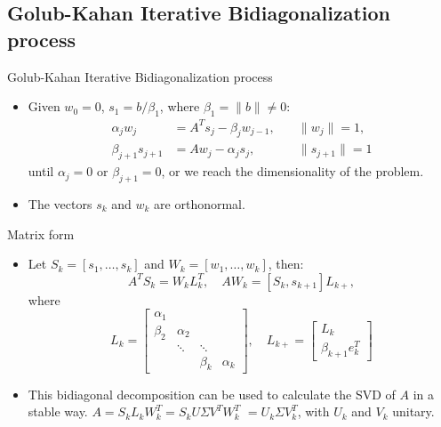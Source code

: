 \documentclass{beamer}
\begin{document}
\subsection{Golub-Kahan Iterative Bidiagonalization process}
\begin{frame}{Golub-Kahan Iterative Bidiagonalization process}
  \begin{itemize}  
    \item Given $w_{0} = 0$, $s_{1} = b/\beta_{1}$, where $\beta_{1} = \|b\| 
      \neq 0$:
      \begin{align*}
	\alpha_{j}w_{j} &= A^{T}s_{j} - \beta_{j}w_{j-1}, &\quad \|w_{j}\|=1,\\
	\beta_{j+1}s_{j+1} &= Aw_{j} - \alpha_{j}s_{j}, &\quad \|s_{j+1}\|=1
      \end{align*}
      until $\alpha_{j} = 0$ or $\beta_{j+1} = 0$, or we reach the
      dimensionality of the problem.
    
    \item The vectors $s_{k}$ and $w_{k}$ are orthonormal. 
  \end{itemize}
\end{frame}

\begin{frame}{Matrix form}
  \begin{itemize}
    \item Let $S_{k} = [s_{1},\ldots,s_{k}]$ and $W_{k}= [w_{1},\ldots,w_{k}]$,
      then:
      \begin{equation*}
	A^{T}S_{k} = W_{k}L_{k}^{T}, \quad AW_{k} = [S_{k},s_{k+1}]L_{k+},
      \end{equation*}
      where
      \begin{equation*}
	L_{k} =
	\begin{bmatrix}
	  \alpha_{1} & & & \\
	  \beta_{2} & \alpha_{2} & & \\
	  & \ddots & \ddots & \\
	  & & \beta_{k} & \alpha_{k}
	\end{bmatrix}, \quad
	L_{k+} = 
	\begin{bmatrix}
	  L_{k} \\
	  \beta_{k+1}e_{k}^{T}
	\end{bmatrix}
      \end{equation*}

    \item This bidiagonal decomposition can be used to calculate the SVD of $A$
      in a stable way. $A = S_{k}L_{k}W_{k}^{T} = S_{k}U\Sigma V^{T}W_{k}^{T}$
      $= U_{k}\Sigma V_{k}^{T}$, with $U_{k}$ and $V_{k}$ unitary.
  \end{itemize}
\end{frame}
\end{document}
